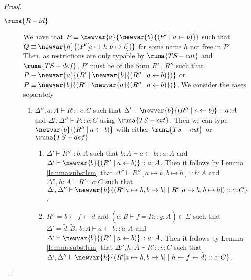 \begin{theorem}
\begin{proof}
\begin{description}
\item[$\runa{R-id}$] We have that $P \equiv \newvar{a}{\newvar{b}{(P' \mid a \leftarrow b)}}$ such that $Q \equiv \newvar{h}{(P'[a\mapsto h,b\mapsto h])}$ for some name $h$ not free in $P'$. Then, as restrictions are only typable by $\runa{TS-cut}$ and $\runa{TS-def}$, $P'$ must be of the form $R' \mid R''$ such that $P \equiv \newvar{a}{(R' \mid \newvar{b}{(R'' \mid a \leftarrow b)})}$ or $P \equiv \newvar{b}{(R' \mid \newvar{a}{(R'' \mid a \leftarrow b)})}$. We consider the cases separately
\begin{enumerate}
    \item $\Delta'',a:A \vdash R' :: c\!:\!C$ such that $\Delta'\vdash \newvar{b}{(R'' \mid a \leftarrow b)} :: a\!:\!A$ and $\Delta',\Delta''\vdash P :: c\!:\!C$ using $\runa{TS-cut}$. Then we can type $\newvar{b}{(R'' \mid a \leftarrow b)}$ with either $\runa{TS-cut}$ or $\runa{TS-def}$
    \begin{enumerate}
        \item $\Delta' \vdash R'' :: b\!:\!A$ such that $b:A\vdash a \leftarrow b :: a\!:\!A$ and $\Delta' \vdash \newvar{b}{(R'' \mid a \leftarrow b)} :: a\!:\!A$. Then it follows by Lemma \ref{lemma:substlem} that $\Delta''\vdash R''[a\mapsto h,b\mapsto h] :: h\!:\!A$ and $\Delta'',h:A \vdash R' :: c\!:\!C$ such that $\Delta',\Delta''\vdash\newvar{h}{(R'[a\mapsto h,b\mapsto h] \mid R''[a\mapsto h,b\mapsto h]) :: c\!:\!C}$.
        
        \item $R'' = b \leftarrow f \leftarrow \widetilde{d}$ and $(\widetilde{e} : \widetilde{B}\vdash f = R :: g\!:\!A) \in \Sigma$ such that $\Delta' = \widetilde{d}:\widetilde{B}$, $b:A\vdash a \leftarrow b :: a\!:\!A$ and $\Delta' \vdash \newvar{b}{(R'' \mid a \leftarrow b)} :: a\!:\!A$. Then it follows by Lemma \ref{lemma:substlem} that $\Delta'',h:A \vdash R' :: c\!:\!C$ such that $\Delta',\Delta''\vdash\newvar{h}{(R'[a\mapsto h,b\mapsto h] \mid h \leftarrow f \leftarrow \widetilde{d}) :: c\!:\!C}$.
    \end{enumerate}
    
    

\end{enumerate}
\end{description}
\end{proof}
\end{theorem}
